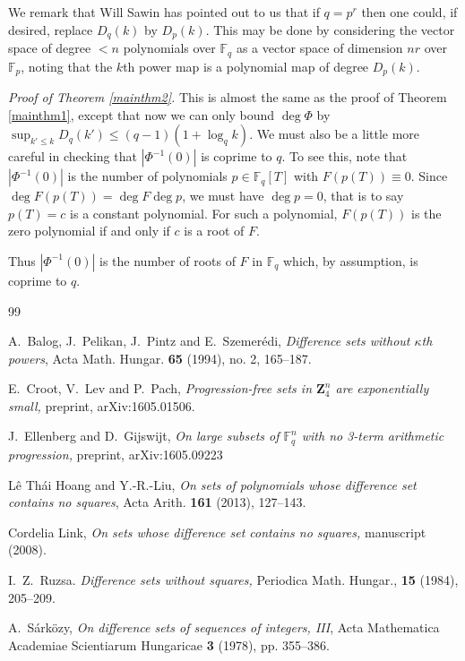 \documentclass[12pt,reqno]{amsart}
\theoremstyle{definition}
\renewcommand{\leq}{\leqslant}
\def\F{\mathbb{F}}
\def\Z{\mathbf{Z}}
\numberwithin{equation}{section}
\begin{document}
We remark that Will Sawin has pointed out to us that if $q = p^r$ then one could, if desired, replace $D_q(k)$ by $D_p(k)$. This may be done by considering the vector space of degree $< n$ polynomials over $\F_q$ as a vector space of dimension $nr$ over $\F_p$, noting that the $k$th power map is a polynomial map of degree $D_p(k)$. 


\emph{Proof of Theorem \ref{mainthm2}.} This is almost the same as the proof of Theorem \ref{mainthm1}, except that now we can only bound $\deg \Phi$ by $\sup_{k' \leq k} D_q(k') \leq (q - 1)(1 + \log_q k)$. We must also be a little more careful in checking that $|\Phi^{-1}(0)|$ is coprime to $q$. To see this, note that $|\Phi^{-1}(0)|$ is the number of polynomials $p \in \F_q[T]$ with $F(p(T)) \equiv 0$. Since $\deg F(p(T)) = \deg F \deg p$, we must have $\deg p = 0$, that is to say $p(T) = c$ is a constant polynomial. For such a polynomial, $F(p(T))$ is the zero polynomial if and only if $c$ is a root of $F$. 

 Thus $|\Phi^{-1}(0)|$ is the number of roots of $F$ in $\F_q$ which, by assumption, is coprime to $q$.


\begin{thebibliography}{99}

 A.~Balog, J.~Pelikan, J.~Pintz and E.~Szemer\'edi, \emph{Difference sets without $\kappa$th powers}, Acta Math. Hungar. \textbf{65} (1994), no. 2, 165--187.


 E.~Croot, V.~Lev and P.~Pach, \emph{Progression-free sets in $\Z_4^n$ are exponentially small,} preprint, arXiv:1605.01506.

  J.~Ellenberg and D.~Gijswijt, \emph{On large subsets of $\F_q^n$ with no 3-term arithmetic progression,} preprint, arXiv:1605.09223

 L\^e Th\'ai Hoang and Y.-R.-Liu, \emph{On sets of polynomials whose difference set contains no squares}, Acta Arith. \textbf{161} (2013), 127--143. 

 Cordelia Link, \emph{On sets whose difference set contains no squares,} manuscript (2008). 

 I.~Z.~Ruzsa. \emph{Difference sets without squares,} Periodica Math. Hungar., \textbf{15} (1984), 205--209.

 A.~S\'ark\"ozy, \emph{On difference sets of sequences of integers, III}, Acta Mathematica Academiae Scientiarum Hungaricae \textbf{3} (1978), pp. 355--386.



\end{thebibliography}
\end{document}

